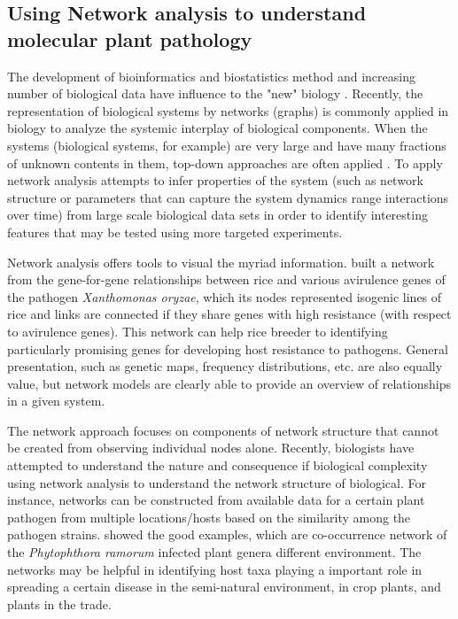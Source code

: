 \subsection*{Using Network analysis to understand molecular plant pathology}

The development of bioinformatics and biostatistics method and increasing number of biological data have influence to the "new" biology . Recently, the representation of biological systems by networks (graphs) is commonly applied in biology to analyze the systemic interplay of biological components. When the systems (biological systems, for example) are very large and have many fractions of unknown contents in them, top-down approaches are often applied . To apply network analysis attempts to infer properties of the system (such as network structure or parameters that can capture the system dynamics range interactions over time) from large scale biological data sets in order to identify interesting features that may be tested using more targeted experiments. 

Network analysis offers tools to visual the myriad information.  built a network from the gene-for-gene relationships between rice and various avirulence genes of the pathogen \textit{Xanthomonas oryzae}, which its nodes represented isogenic lines of rice and links are connected if they share genes with high resistance (with respect to avirulence genes). This network can help rice breeder to identifying particularly promising genes for developing host resistance to pathogens. General presentation, such as genetic maps, frequency distributions, etc. are also equally value, but network models are clearly able to provide an overview of relationships in a given system. 

The network approach focuses on components of network structure that cannot be created from observing individual nodes alone. Recently, biologists have attempted to understand the nature and consequence if biological complexity using network analysis to understand the network structure of biological. For instance, networks can be constructed from available data for a certain plant pathogen from multiple locations/hosts based on the similarity among the pathogen strains.  showed the good examples, which are co-occurrence network of the \textit{Phytophthora ramorum} infected plant genera different environment. The networks may be helpful in identifying host taxa playing a important role in spreading a certain disease in the semi-natural environment, in crop plants, and plants in the trade.

